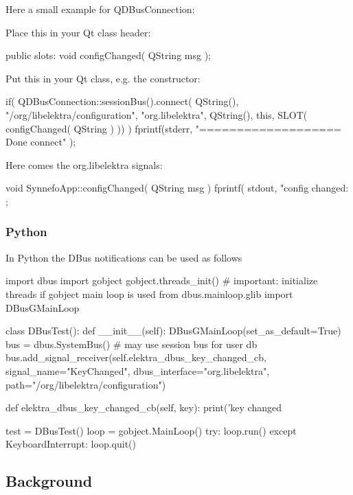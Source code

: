Here a small example for Q\+D\+Bus\+Connection\+:

Place this in your Qt class header\+: \begin{DoxyVerb}public slots:
  void configChanged( QString msg );
\end{DoxyVerb}


Put this in your Qt class, e.\+g. the constructor\+: \begin{DoxyVerb}if( QDBusConnection::sessionBus().connect( QString(), "/org/libelektra/configuration", "org.libelektra", QString(),
                                       this, SLOT( configChanged( QString ) )) )
    fprintf(stderr, "=================== Done connect\n" );
\end{DoxyVerb}


Here comes the org.\+libelektra signals\+: \begin{DoxyVerb}void SynnefoApp::configChanged( QString msg )
{
  fprintf( stdout, "config changed: %
};
\end{DoxyVerb}


\subsubsection*{Python}

In Python the D\+Bus notifications can be used as follows


\begin{DoxyCode}
import dbus
import gobject
gobject.threads\_init()  # important: initialize threads if gobject main loop is used
from dbus.mainloop.glib import DBusGMainLoop

class DBusTest():
    def \_\_init\_\_(self):
        DBusGMainLoop(set\_as\_default=True)
        bus = dbus.SystemBus()  # may use session bus for user db
        bus.add\_signal\_receiver(self.elektra\_dbus\_key\_changed\_cb,
            signal\_name="KeyChanged",
            dbus\_interface="org.libelektra",
            path="/org/libelektra/configuration")

    def elektra\_dbus\_key\_changed\_cb(self, key):
        print('key changed %

test = DBusTest()
loop = gobject.MainLoop()
try:
    loop.run()
except KeyboardInterrupt:
    loop.quit()
\end{DoxyCode}


\subsection*{Background}

